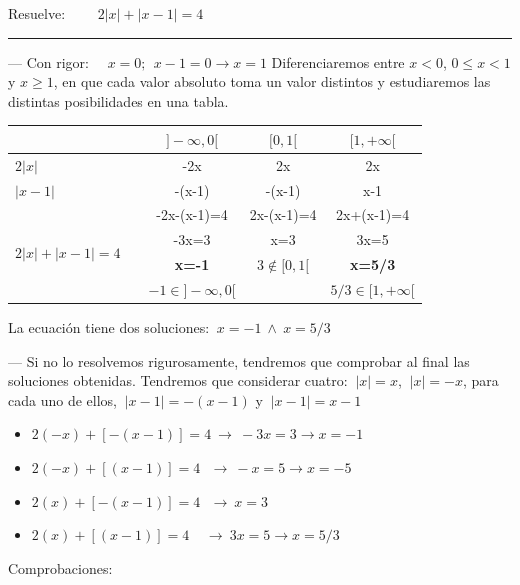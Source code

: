 \begin{miejercicio}

Resuelve: $\qquad 2|x|+|x-1|=4$

\rule{250pt}{0.1pt}

\vspace{2mm} --- Con rigor:	$\quad x=0;\ \ x-1=0\to x=1$ Diferenciaremos entre $x<0$, $0\le x<1$ y $x\ge 1$, en que cada valor absoluto toma un valor distintos y estudiaremos las distintas posibilidades en una tabla.


\begin{table}[H]
\centering
\begin{tabular}{l|c|c|c|}
\cline{2-4}
 & $]-\infty,0[$ & $[0,1[$ & $[1,+\infty[$ \\ \hline
\multicolumn{1}{|l|}{$2|x|$} & -2x & 2x & 2x \\ \hline
\multicolumn{1}{|l|}{$|x-1|$} & -(x-1) & -(x-1) & x-1 \\ \hline
\multicolumn{1}{|l|}{\multirow{4}{*}{$2|x|+|x-1|=4\quad $}} & -2x-(x-1)=4 & 2x-(x-1)=4 & 2x+(x-1)=4 \\
\multicolumn{1}{|l|}{} & -3x=3 & x=3 & 3x=5 \\
\multicolumn{1}{|l|}{} & \textbf{x=-1} & $3\notin [0,1[$ & \textbf{x=5/3} \\
\multicolumn{1}{|l|}{} & $-1\in ]-\infty,0$[ &  & $5/3\in[1,+\infty$[ \\ \hline
\end{tabular}
\end{table}
La ecuación tiene dos soluciones: $\ x=-1 \ \wedge \ x=5/3$

\vspace{5mm} --- Si no lo resolvemos rigurosamente, tendremos que comprobar al  final las soluciones obtenidas. Tendremos que considerar cuatro: $\ |x|=x$, $\ |x|=-x$, para cada uno de ellos, $\ |x-1|=-(x-1)$ y $\ |x-1|=x-1$

\begin{itemize}
\item $2(-x)+[-(x-1)]=4 \ \to \ -3x=3 \to x=-1$	
\item $2(-x)+[(x-1)]=4 \ \ \ \to \ -x=5 \to x=-5$	
\item $2(x)+[-(x-1)]=4 \ \ \ \to \ x=3$	
\item $2(x)+[(x-1)]=4 \ \ \ \ \ \to \ 3x=5 \to x=5/3 $	
\end{itemize}

Comprobaciones:


\end{miejercicio}
